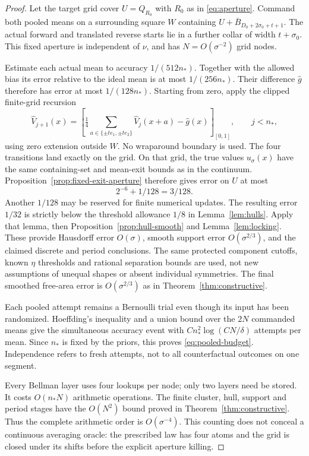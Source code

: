 \begin{proof}
Let the target grid cover $U=Q_{R_0}$ with $R_0$ as in
\eqref{eq:aperture}. Command both pooled means on a surrounding square
$W$ containing $U+\overline B_{D_0+2\sigma_0+t+1}$.
The actual forward and translated reverse starts lie in a further
collar of width $t+\sigma_0$. This fixed aperture is independent of
$\nu$, and has $N=O(\sigma^{-2})$ grid nodes.

Estimate each actual mean to accuracy $1/(512n_*)$. Together with the
allowed bias its error relative to the ideal mean is at most
$1/(256n_*)$. Their difference $\widehat g$ therefore has error at
most $1/(128n_*)$. Starting from zero, apply the clipped finite-grid
recursion
\[
 \widehat V_{j+1}(x)=\left[
   \tfrac14\sum_{a\in\{\pm te_1,\pm te_2\}}
        \widehat V_j(x+a)-\widehat g(x)\right]_{[0,1]},
 \qquad j<n_*,
\]
using zero extension outside $W$. No wraparound boundary is used.
The four transitions land exactly on the grid. On that grid, the
true values $u_\sigma(x)$ have the same containing-set and mean-exit
bounds as in the continuum. Proposition~\ref{prop:fixed-exit-aperture}
therefore gives error on $U$ at most
\[
       2^{-6}+1/128=3/128.
\]
Another $1/128$ may be reserved for finite numerical updates. The
resulting error $1/32$ is strictly below the threshold allowance $1/8$
in Lemma~\ref{lem:hulls}. Apply that lemma, then
Proposition~\ref{prop:hull-smooth} and Lemma~\ref{lem:locking}.
These provide Hausdorff error $O(\sigma)$, smooth support error
$O(\sigma^{2/3})$, and the claimed discrete and period conclusions.
The same protected component cutoffs, known $\eta$ thresholds and
rational separation bounds are used, not new assumptions of unequal
shapes or absent individual symmetries. The final smoothed free-area
error is $O(\sigma^{2/3})$ as in Theorem~\ref{thm:constructive}.

Each pooled attempt remains a Bernoulli trial even though its input
has been randomized. Hoeffding's inequality and a union bound over the
$2N$ commanded means give the simultaneous accuracy event with
$Cn_*^2\log(CN/\delta)$ attempts per mean. Since $n_*$ is fixed by
the priors, this proves \eqref{eq:pooled-budget}. Independence refers
to fresh attempts, not to all counterfactual outcomes on one segment.

Every Bellman layer uses four lookups per node; only two layers need be
stored. It costs $O(n_*N)$ arithmetic operations. The finite cluster,
hull, support and period stages have the $O(N^2)$ bound proved in
Theorem~\ref{thm:constructive}. Thus the complete arithmetic order is
$O(\sigma^{-4})$. This counting does not conceal a continuous averaging
oracle: the prescribed law has four atoms and the grid is closed under
its shifts before the explicit aperture killing.
\end{proof}

